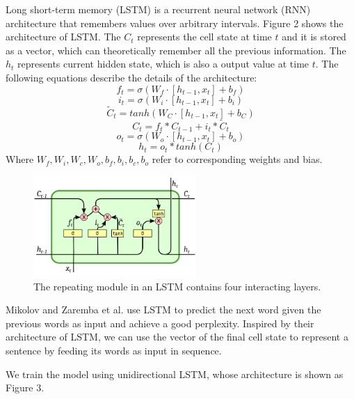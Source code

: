 \documentclass{sig-alternate}
\begin{document}
Long short-term memory (LSTM) is a recurrent neural network (RNN) architecture 
that remembers values over arbitrary intervals. Figure 2 shows the architecture 
of LSTM. The $C_t$ represents the cell state at time $t$ and it is stored as a 
vector, which can theoretically remember all the previous information. The 
$h_t$ represents current hidden state, which is also a output value at time 
$t$. The following equations describe the details of the architecture:
\begin{equation}
   f_t = \sigma(W_f \cdot [h_{t-1}, x_t] + b_f)
\end{equation}
\begin{equation}
   i_t = \sigma(W_i \cdot [h_{t-1}, x_t] + b_i)
\end{equation}
\begin{equation}
   \tilde{C}_t = tanh(W_C \cdot [h_{t-1}, x_t] + b_C) 
\end{equation}
\begin{equation}
   C_t = f_t * C_{t-1} + i_t * \tilde{C}_t
\end{equation}
\begin{equation}
   o_t = \sigma(W_o \cdot [h_{t-1}, x_t] + b_o)
\end{equation}
\begin{equation}
   h_t = o_t * tanh(C_t)
\end{equation}
Where $W_f, W_i, W_c, W_o, b_f, b_i, b_c, b_o$ refer to corresponding weights and bias.
\begin{figure}
  \centering
  \includegraphics[height=1.5in, width=2.44in]{lstm2.png}
  \caption{The repeating module in an LSTM contains four interacting layers.}
\end{figure}

Mikolov\cite{Mikolov2} and Zaremba et al.\cite{Zaremba} use LSTM to predict the next 
word given the previous words as input and achieve a good perplexity. Inspired 
by their architecture of LSTM, we can use the vector of the final cell state to 
represent a sentence by feeding its words as input in sequence.

We train the model using unidirectional LSTM, whose architecture is shown as 
Figure 3. 
\end{document}
